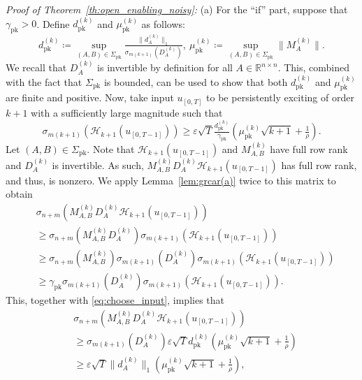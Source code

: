 \documentclass[journal,twoside,web]{ieeecolor}
\begin{document}
\textit{Proof of Theorem~\ref{th:open_enabling_noisy}:} (a) For the ``if'' part, suppose that $\gamma_\text{pk}>0$. Define $d_\text{pk}^{(k)}$ and $\mu_\text{pk}^{(k)}$ as follows:
\begin{equation}
d_\text{pk}^{(k)}\coloneqq \sup_{(A,B)\in\Sigma_\text{pk}}\tfrac{\|d_A^{(k)}\|_1}{\sigma_{m(k+1)}(D^{(k)}_A)},\  \mu_\text{pk}^{(k)}\coloneqq \sup_{(A,B)\in\Sigma_\text{pk}}\|M_A^{(k)}\|.
\end{equation}
We recall that $D^{(k)}_A$ is invertible by definition for all \mbox{$A\in\mathbb{R}^{n\times n}$}. This, combined with the fact that $\Sigma_\text{pk}$ is bounded, can be used to show that both $d_\text{pk}^{(k)}$ and $\mu_\text{pk}^{(k)}$ are finite and positive. Now, take input $u_{[0,T]}$ to be persistently exciting of order $k+1$ with a sufficiently large magnitude such that
\begin{equation}
\label{eq:choose_input}
\sigma_{m(k+1)}(\mathcal{H}_{k+1}(u_{[0,T-1]}))\geq \varepsilon\sqrt{T}\tfrac{d_\text{pk}^{(k)}}{\gamma_\text{pk}}\left(\mu_\text{pk}^{(k)}\sqrt{k+1}+\tfrac{1}{\rho}\right).
\end{equation}
Let $(A,B)\in\Sigma_\text{pk}$. Note that $\mathcal{H}_{k+1}(u_{[0,T-1]})$ and $M^{(k)}_{A,B}$ have full row rank and $D_{A}^{(k)}$ is invertible. As such, $M^{(k)}_{A,B}D_{A}^{(k)}\mathcal{H}_{k+1}(u_{[0,T-1]})$ has full row rank, and thus, is nonzero. We apply Lemma~\ref{lem:grcar(a)} twice to this matrix to obtain
\begin{equation}
\begin{split}
&\sigma_{n+m}(M^{(k)}_{A,B}D_{A}^{(k)}\mathcal{H}_{k+1}(u_{[0,T-1]}))\\
&\geq\sigma_{n+m}(M^{(k)}_{A,B} D_{A}^{(k)})\sigma_{m(k+1)}(\mathcal{H}_{k+1}(u_{[0,T-1]})) \\
&\geq\sigma_{n+m}(M^{(k)}_{A,B} )\sigma_{m(k+1)}(D_{A}^{(k)})\sigma_{m(k+1)}(\mathcal{H}_{k+1}(u_{[0,T-1]})) \\
&\geq\gamma_\text{pk}\sigma_{m(k+1)}(D_{A}^{(k)})\sigma_{m(k+1)}(\mathcal{H}_{k+1}(u_{[0,T-1]})).
\end{split}
\end{equation}
This, together with \eqref{eq:choose_input}, implies that
\begin{equation}
\label{eq:LHS_lowerbound}
\begin{split}
&\sigma_{n+m}(M^{(k)}_{A,B}D_{A}^{(k)}\mathcal{H}_{k+1}(u_{[0,T-1]}))\\
&\geq\sigma_{m(k+1)}(D_{A}^{(k)})\varepsilon\sqrt{T}d_\text{pk}^{(k)}\left(\mu_\text{pk}^{(k)}\sqrt{k+1}+\tfrac{1}{\rho}\right)\\
&\geq\varepsilon\sqrt{T}\|d_A^{(k)}\|_1\left(\mu_\text{pk}^{(k)}\sqrt{k+1}+\tfrac{1}{\rho}\right),
\end{split}
\end{equation}
\end{document}
